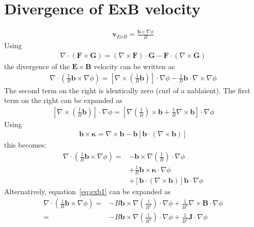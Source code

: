 \documentclass[12pt]{article}
\def\L{\left}
\def\R{\right}
\newcommand{\ve}[1]{\ensuremath{\boldsymbol{#1}}}
\begin{document}
\section{Divergence of ExB velocity}
%
\begin{align*}
\ve{v}_{ExB} = \frac{\ve{b}\times\nabla\phi}{B}
\end{align*}
%
Using
%
\begin{align*}
\nabla\cdot\L(\ve{F}\times\ve{G}\R) =
\L(\nabla\times\ve{F}\R)\cdot\ve{G} -
\ve{F}\cdot\L(\nabla\times\ve{G}\R)
\end{align*}
%
the divergence of the $\ve{E}\times\ve{B}$ velocity can be written as
%
\begin{align}
\nabla\cdot\L(\frac{1}{B}\ve{b}\times\nabla\phi\R) =
\L[\nabla\times\L(\frac{1}{B}\ve{b}\R)\R]\cdot\nabla\phi -
\frac{1}{B}\ve{b}\cdot\nabla\times\nabla\phi
\label{eq:exb1}
\end{align}
%
The second term on the right is identically zero (curl of a nablaient). The
first term on the right can be expanded as
%
\begin{align*}
\L[\nabla\times\L(\frac{1}{B}\ve{b}\R)\R]\cdot\nabla\phi =
\L[\nabla\L(\frac{1}{B}\R)\times\ve{b} +
\frac{1}{B}\nabla\times\ve{b}\R]\cdot\nabla\phi
\end{align*}
%
Using
%
\begin{align*}
\ve{b}\times\ve{\kappa} = \nabla\times\ve{b} -
\ve{b}\L[\ve{b}\cdot\L(\nabla\times\ve{b}\R)\R]
\end{align*}
%
this becomes:
%
\begin{align*}
  \nabla\cdot\L(\frac{1}{B}\ve{b}\times\nabla\phi\R) =
  &-\ve{b}\times\nabla\L(\frac{1}{B}\R)\cdot\nabla\phi \\ &+
  \frac{1}{B}\ve{b}\times\ve{\kappa}\cdot\nabla\phi \\ &+
  \L[\ve{b}\cdot\L(\nabla\times\ve{b}\R)\R]\ve{b}\cdot\nabla\phi
\end{align*}
%
Alternatively, equation~\ref{eq:exb1} can be expanded as
%
\begin{align*}
  \nabla\cdot\L(\frac{1}{B}\ve{b}\times\nabla\phi\R) =&
    -B\ve{b}\times\nabla\L(\frac{1}{B^2}\R)\cdot\nabla\phi +
    \frac{1}{B^2}\nabla\times\ve{B}\cdot\nabla\phi \\ =&
    -B\ve{b}\times\nabla\L(\frac{1}{B^2}\R)\cdot\nabla\phi +
    \frac{1}{B^2}\ve{J}\cdot\nabla\phi
\end{align*}
%
\end{document}
